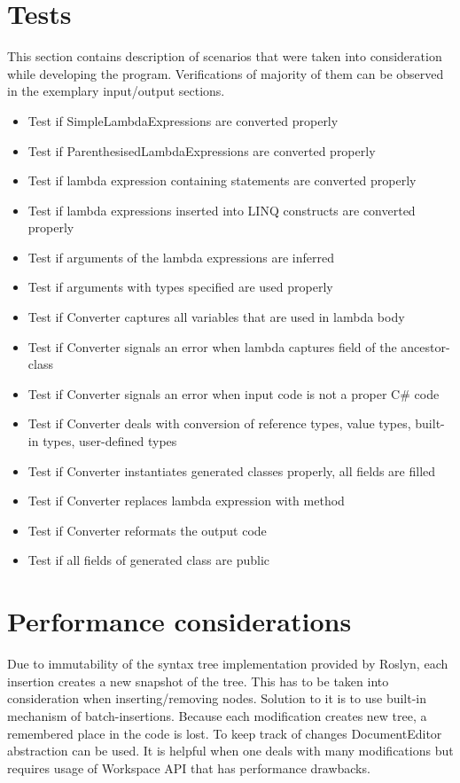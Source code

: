 \documentclass[]{report}
\begin{document}
    
    \section{Tests}
This section contains description of scenarios that were taken into consideration while developing the program. Verifications of majority of them can be observed in the exemplary input/output sections.

     \begin{itemize}
         \item Test if SimpleLambdaExpressions are converted properly
         \item Test if ParenthesisedLambdaExpressions are converted properly
         \item Test if lambda expression containing statements are converted properly
         \item Test if lambda expressions inserted into LINQ constructs are converted properly
         \item Test if arguments of the lambda expressions are inferred
         \item Test if arguments with types specified are used properly
         \item Test if Converter captures all variables that are  used in lambda body
        \item Test if Converter signals an error when lambda captures field of the ancestor-class
        \item Test if Converter signals an error when input code is not a proper C\# code
        \item Test if Converter deals with conversion of reference types, value types, built-in types, user-defined  types
        \item Test if Converter instantiates generated classes properly, all fields are filled
        \item Test if Converter replaces lambda expression with method
        \item Test if Converter reformats the output code
        \item Test if all fields of generated class are public
        \end{itemize}
     

    
    
    
    \section{Performance considerations}
    Due to immutability of the syntax tree implementation provided by Roslyn, each insertion creates a new snapshot of the tree. This has to be taken into consideration when inserting/removing nodes. Solution to it is to use built-in mechanism of batch-insertions. Because each modification creates new tree, a remembered place in the code is lost. To keep track of changes DocumentEditor abstraction can be used. It is helpful when one deals with many modifications but requires usage of Workspace API that has performance drawbacks.
    
\end{document}
